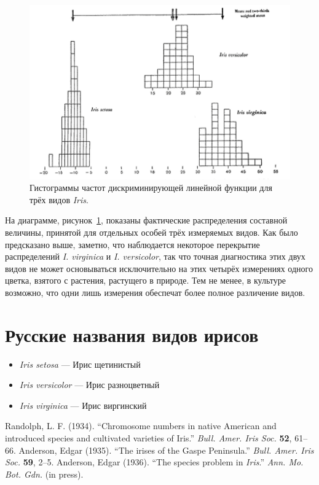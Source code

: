 \documentclass[12pt]{article}
\begin{document}
\begin{figure}[!b]
\centering
\includegraphics[width=1\linewidth]{img.png}
\caption{Гистограммы частот дискриминирующей линейной функции для трёх видов \textit{Iris}.}
\label{fig:1}
\end{figure}
На диаграмме, рисунок~\ref{fig:1}, показаны фактические распределения составной величины, принятой для отдельных особей трёх измеряемых видов. Как было предсказано выше, заметно, что наблюдается некоторое перекрытие распределений \textit{I. virginica} и \textit{I. versicolor}, так что точная диагностика этих двух видов не может основываться исключительно на этих четырёх измерениях одного цветка, взятого с растения, растущего в природе. Тем не менее, в культуре возможно, что одни лишь измерения обеспечат более полное различение видов.


\section*{Русские названия видов ирисов}
\begin{itemize}
\item \textit{Iris setosa} — Ирис щетинистый
\item \textit{Iris versicolor} — Ирис разноцветный
\item \textit{Iris virginica} — Ирис виргинский
\end{itemize}

\begin{thebibliography}{9}
 Randolph, L. F. (1934). ``Chromosome numbers in native American and introduced species and cultivated varieties of Iris.'' \textit{Bull. Amer. Iris Soc.} \textbf{52}, 61--66.
 Anderson, Edgar (1935). ``The irises of the Gaspe Peninsula.'' \textit{Bull. Amer. Iris Soc.} \textbf{59}, 2--5.
 Anderson, Edgar (1936). ``The species problem in \textit{Iris}.'' \textit{Ann. Mo. Bot. Gdn.} (in press).
\end{thebibliography}
\end{document}
